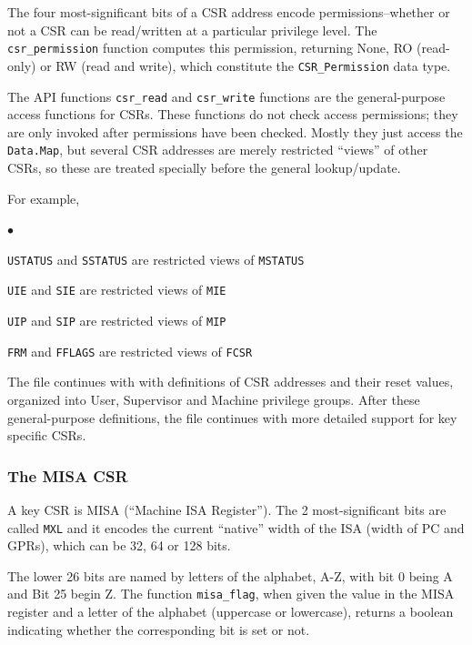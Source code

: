 \documentclass[11pt]{article}
\newenvironment{tightlist}%
{\begin{list}{$\bullet$}{%
    \setlength{\topsep}{0in}
    \setlength{\partopsep}{0in}
    \setlength{\itemsep}{0in}
    \setlength{\parsep}{0in}
    \setlength{\leftmargin}{1.5em}
    \setlength{\rightmargin}{0in}
    \setlength{\itemindent}{0in}
}
}%
{\end{list}
}
\begin{document}
The four most-significant bits of a CSR address encode
permissions--whether or not a CSR can be read/written at a particular
privilege level.  The \verb|csr_permission| function computes this
permission, returning None, RO (read-only) or RW (read and write),
which constitute the \verb|CSR_Permission| data type.

The API functions \verb|csr_read| and \verb|csr_write| functions are
the general-purpose access functions for CSRs.  These functions do not
check access permissions; they are only invoked after permissions have
been checked.  Mostly they just access the \verb|Data.Map|, but
several CSR addresses are merely restricted ``views'' of other CSRs,
so these are treated specially before the general lookup/update.

For example,
\begin{tightlist}
\item
\verb|USTATUS| and \verb|SSTATUS| are restricted views of \verb|MSTATUS|

\item
\verb|UIE| and \verb|SIE| are restricted views of \verb|MIE|

\item
\verb|UIP| and \verb|SIP| are restricted views of \verb|MIP|

\item
\verb|FRM| and \verb|FFLAGS| are restricted views of \verb|FCSR|
\end{tightlist}

The file continues with with definitions of CSR addresses and their
reset values, organized into User, Supervisor and Machine privilege
groups.  After these general-purpose definitions, the file continues
with more detailed support for key specific CSRs.


\subsubsection{The MISA CSR}

A key CSR is MISA (``Machine ISA Register'').  The 2 most-significant
bits are called \verb|MXL| and it encodes the current ``native'' width
of the ISA (width of PC and GPRs), which can be 32, 64 or 128 bits.



The lower 26 bits are named by letters of the alphabet, A-Z, with bit
0 being A and Bit 25 begin Z.  The function \verb|misa_flag|, when
given the value in the MISA register and a letter of the alphabet
(uppercase or lowercase), returns a boolean indicating whether the
corresponding bit is set or not.
\end{document}
